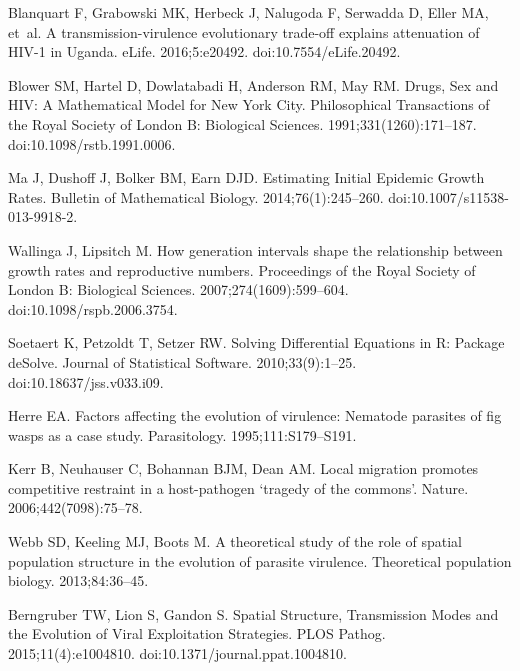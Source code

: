 \documentclass[10pt,letterpaper]{article}
\begin{document}
\begin{thebibliography}{10}
Blanquart F, Grabowski MK, Herbeck J, Nalugoda F, Serwadda D, Eller MA, et~al.
\newblock A transmission-virulence evolutionary trade-off explains attenuation
  of {HIV}-1 in {Uganda}.
\newblock eLife. 2016;5:e20492.
\newblock doi:{10.7554/eLife.20492}.

Blower SM, Hartel D, Dowlatabadi H, Anderson RM, May RM.
\newblock Drugs, Sex and {HIV}: A Mathematical Model for {New York City}.
\newblock Philosophical Transactions of the Royal Society of London B:
  Biological Sciences. 1991;331(1260):171--187.
\newblock doi:{10.1098/rstb.1991.0006}.

Ma J, Dushoff J, Bolker BM, Earn DJD.
\newblock Estimating Initial Epidemic Growth Rates.
\newblock Bulletin of Mathematical Biology. 2014;76(1):245--260.
\newblock doi:{10.1007/s11538-013-9918-2}.

Wallinga J, Lipsitch M.
\newblock How generation intervals shape the relationship between growth rates
  and reproductive numbers.
\newblock Proceedings of the Royal Society of London B: Biological Sciences.
  2007;274(1609):599--604.
\newblock doi:{10.1098/rspb.2006.3754}.

Soetaert K, Petzoldt T, Setzer RW.
\newblock Solving Differential Equations in {R}: Package {deSolve}.
\newblock Journal of Statistical Software. 2010;33(9):1--25.
\newblock doi:{10.18637/jss.v033.i09}.

Herre EA.
\newblock Factors affecting the evolution of virulence: Nematode parasites of
  fig wasps as a case study.
\newblock Parasitology. 1995;111:S179--S191.

Kerr B, Neuhauser C, Bohannan BJM, Dean AM.
\newblock Local migration promotes competitive restraint in a host-pathogen
  `tragedy of the commons'.
\newblock Nature. 2006;442(7098):75--78.

Webb SD, Keeling MJ, Boots M.
\newblock A theoretical study of the role of spatial population structure in
  the evolution of parasite virulence.
\newblock Theoretical population biology. 2013;84:36--45.

Berngruber TW, Lion S, Gandon S.
\newblock Spatial {Structure}, {Transmission} {Modes} and the {Evolution} of
  {Viral} {Exploitation} {Strategies}.
\newblock PLOS Pathog. 2015;11(4):e1004810.
\newblock doi:{10.1371/journal.ppat.1004810}.


\end{thebibliography}
\end{document}
